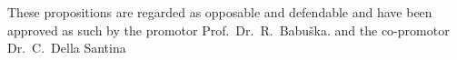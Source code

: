 \documentclass{propositions}
\begin{document}
\bigskip
\bigskip

\begin{center}
These propositions are regarded as opposable and defendable and have been approved as such by the
promotor Prof.\ Dr.\ R.\ Babu\v{s}ka.
and the co-promotor Dr.\ C.\ Della Santina
\end{center}




















\end{document}
